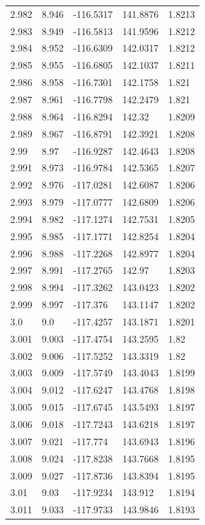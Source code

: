 \begin{tabular}{lllll}
2.982 & 8.946 & -116.5317 & 141.8876 & 1.8213 \\
2.983 & 8.949 & -116.5813 & 141.9596 & 1.8212 \\
2.984 & 8.952 & -116.6309 & 142.0317 & 1.8212 \\
2.985 & 8.955 & -116.6805 & 142.1037 & 1.8211 \\
2.986 & 8.958 & -116.7301 & 142.1758 & 1.821 \\
2.987 & 8.961 & -116.7798 & 142.2479 & 1.821 \\
2.988 & 8.964 & -116.8294 & 142.32 & 1.8209 \\
2.989 & 8.967 & -116.8791 & 142.3921 & 1.8208 \\
2.99 & 8.97 & -116.9287 & 142.4643 & 1.8208 \\
2.991 & 8.973 & -116.9784 & 142.5365 & 1.8207 \\
2.992 & 8.976 & -117.0281 & 142.6087 & 1.8206 \\
2.993 & 8.979 & -117.0777 & 142.6809 & 1.8206 \\
2.994 & 8.982 & -117.1274 & 142.7531 & 1.8205 \\
2.995 & 8.985 & -117.1771 & 142.8254 & 1.8204 \\
2.996 & 8.988 & -117.2268 & 142.8977 & 1.8204 \\
2.997 & 8.991 & -117.2765 & 142.97 & 1.8203 \\
2.998 & 8.994 & -117.3262 & 143.0423 & 1.8202 \\
2.999 & 8.997 & -117.376 & 143.1147 & 1.8202 \\
3.0 & 9.0 & -117.4257 & 143.1871 & 1.8201 \\
3.001 & 9.003 & -117.4754 & 143.2595 & 1.82 \\
3.002 & 9.006 & -117.5252 & 143.3319 & 1.82 \\
3.003 & 9.009 & -117.5749 & 143.4043 & 1.8199 \\
3.004 & 9.012 & -117.6247 & 143.4768 & 1.8198 \\
3.005 & 9.015 & -117.6745 & 143.5493 & 1.8197 \\
3.006 & 9.018 & -117.7243 & 143.6218 & 1.8197 \\
3.007 & 9.021 & -117.774 & 143.6943 & 1.8196 \\
3.008 & 9.024 & -117.8238 & 143.7668 & 1.8195 \\
3.009 & 9.027 & -117.8736 & 143.8394 & 1.8195 \\
3.01 & 9.03 & -117.9234 & 143.912 & 1.8194 \\
3.011 & 9.033 & -117.9733 & 143.9846 & 1.8193 \\

\end{tabular}
